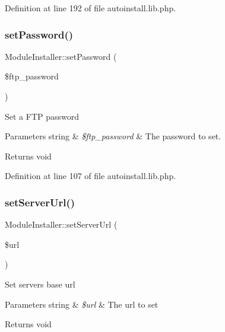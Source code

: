 Definition at line 192 of file autoinstall.\+lib.\+php.

\mbox{\label{classModuleInstaller_ad0cad9e399cc3a7de3f742d43364e96a}} 
\subsubsection{\texorpdfstring{set\+Password()}{setPassword()}}
{\footnotesize\ttfamily Module\+Installer\+::set\+Password (\begin{DoxyParamCaption}\item[{}]{\$ftp\+\_\+password }\end{DoxyParamCaption})}

Set a F\+TP password


\begin{DoxyParams}[1]{Parameters}
string & {\em \$ftp\+\_\+password} & The password to set. \\
\hline
\end{DoxyParams}
\begin{DoxyReturn}{Returns}
void 
\end{DoxyReturn}


Definition at line 107 of file autoinstall.\+lib.\+php.

\mbox{\label{classModuleInstaller_a4b4f25bccb1203ee61ff75dd1a0e0964}} 
\subsubsection{\texorpdfstring{set\+Server\+Url()}{setServerUrl()}}
{\footnotesize\ttfamily Module\+Installer\+::set\+Server\+Url (\begin{DoxyParamCaption}\item[{}]{\$url }\end{DoxyParamCaption})}

Set server\textquotesingle{}s base url


\begin{DoxyParams}[1]{Parameters}
string & {\em \$url} & The url to set \\
\hline
\end{DoxyParams}
\begin{DoxyReturn}{Returns}
void 
\end{DoxyReturn}


